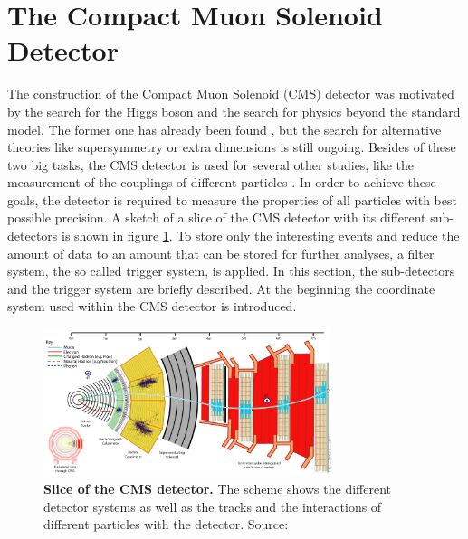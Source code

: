 \section{The Compact Muon Solenoid Detector}
The construction of the Compact Muon Solenoid (CMS) detector \cite{CMSDesignReport} was motivated by the search for the Higgs boson and the search for physics beyond the standard model. The former one has already been found \cite{ATLAS_higgs_1207,CMS_higgs_1207}, but the search for alternative theories like supersymmetry or extra dimensions is still ongoing. Besides of these two big tasks, the CMS detector is used for several other studies, like the measurement of the couplings of different particles \cite{tHq}.
In order to achieve these goals, the detector is required to measure the properties of all particles with best possible precision. A sketch of a slice of the CMS detector with its different sub-detectors is shown in figure \ref{fig:ch_2_cmsslice}. To store only the interesting events and reduce the amount of data to an amount that can be stored for further analyses, a filter system, the so called trigger system, is applied. In this section, the sub-detectors and the trigger system are briefly described. At the beginning the coordinate system used within the CMS detector is introduced.

\begin{figure}
\centering
\includegraphics[width=0.75\textwidth]{chapter_2_detector/CMS_Slice.png}
\caption[CMS Detector Slice]{\textbf{Slice of the CMS detector.} The scheme shows the different detector systems as well as the tracks and the interactions of different particles with the detector. Source: \cite{cmsslice}}
\label{fig:ch_2_cmsslice}
\end{figure}

